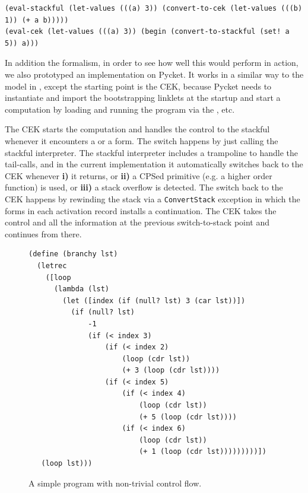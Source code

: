 \begin{verbatim}
(eval-stackful (let-values (((a) 3)) (convert-to-cek (let-values (((b) 1)) (+ a b)))))
(eval-cek (let-values (((a) 3)) (begin (convert-to-stackful (set! a 5)) a)))
\end{verbatim}

In addition the formalism, in order to see how well this would perform
in action, we also prototyped an implementation on Pycket. It works in
a similar way to the model in , except
the starting point is the CEK, because Pycket needs to instantiate and
import the bootstrapping linklets at the startup and start a
computation by loading and running the program via the
,  etc.

The CEK starts the computation and handles the control to the stackful
whenever it encounters a  or a 
form. The switch happens by just calling the stackful interpreter. The
stackful interpreter includes a trampoline to handle the tail-calls,
and in the current implementation it automatically switches back to
the CEK whenever \textbf{i)} it returns, or \textbf{ii)} a CPSed
primitive (e.g. a higher order function) is used, or \textbf{iii)} a
stack overflow is detected. The switch back to the CEK happens by
rewinding the stack via a \verb|ConvertStack| exception in which the
forms in each activation record installs a continuation. The CEK takes
the control and all the information at the previous switch-to-stack
point and continues from there.

\begin{figure}
  \vspace{-0.7cm}
\small
\begin{lstlisting}[mathescape]
(define (branchy lst)
  (letrec
    ([loop
      (lambda (lst)
        (let ([index (if (null? lst) 3 (car lst))])
          (if (null? lst)
              -1
              (if (< index 3)
                  (if (< index 2)
                      (loop (cdr lst))
                      (+ 3 (loop (cdr lst))))
                  (if (< index 5)
                      (if (< index 4)
                          (loop (cdr lst))
                          (+ 5 (loop (cdr lst))))
                      (if (< index 6)
                          (loop (cdr lst))
                          (+ 1 (loop (cdr lst)))))))))])
   (loop lst)))
\end{lstlisting}
\caption{A simple program with non-trivial control flow.}
\label{fig:branchy}
\end{figure}

